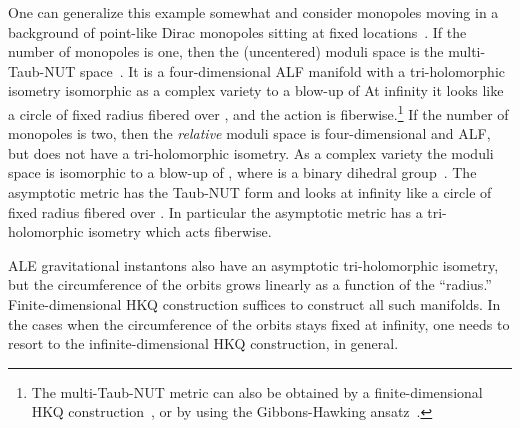 \documentclass[a4paper,12pt, amsfonts, amssymb]{article}
\providecommand{\CC}{{\mathbb C}}
\providecommand{\RR}{{\mathbb R}}
\providecommand{\ZZ}{{\mathbb Z}}
\begin{document}
One can generalize this example somewhat and consider \coordHE{} monopoles moving in a background of \coordHE{} point-like Dirac monopoles sitting at fixed locations~\cite{usthreed}. If the number of \coordHE{} monopoles is one,
then the (uncentered) moduli space is the multi-Taub-NUT
space~\cite{KrTh,usthreed}.
It is a four-dimensional ALF manifold with a tri-holomorphic \coordHE{} isometry
isomorphic as a complex variety to a blow-up of \myHighlight{$\CC^2/\ZZ_n.$}\coordHE{}
At infinity it looks like a circle of fixed radius fibered over \myHighlight{$\RR^3$}\coordHE{},
and the \coordHE{} action is fiberwise.\footnote{The multi-Taub-NUT metric can also be obtained by a finite-dimensional HKQ construction~\cite{HKLR}, or by using the Gibbons-Hawking ansatz~\cite{GH}.}
If the number of \coordHE{} monopoles is two, then the
{\it relative} moduli space is four-dimensional and ALF, but does not have a
tri-holomorphic
\coordHE{} isometry. As a complex variety the moduli space is isomorphic to
a blow-up of \myHighlight{$\CC^2/\Gamma$}\coordHE{}, where \myHighlight{$\Gamma$}\coordHE{} is a binary dihedral
group~\cite{usthreed}.
The asymptotic metric has the Taub-NUT form and looks at infinity like a circle of fixed radius fibered over \myHighlight{$\RR^3/\ZZ_2$}\coordHE{}. In particular the
asymptotic metric has a tri-holomorphic \coordHE{} isometry which acts
fiberwise.

ALE gravitational instantons also have an asymptotic tri-holomorphic \coordHE{} isometry, but the circumference of the orbits grows
linearly as a function of the ``radius.'' Finite-dimensional HKQ construction
suffices to construct all such manifolds. In the cases when the
circumference of the orbits stays fixed at infinity, one needs to resort
to the infinite-dimensional HKQ construction, in general.
\end{document}
